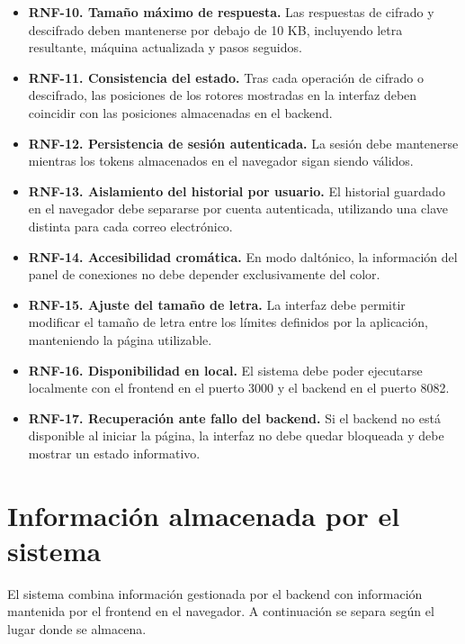 \begin{itemize}
    \item \textbf{RNF-10. Tamaño máximo de respuesta.} Las respuestas de cifrado y descifrado deben mantenerse por debajo de 10 KB, incluyendo letra resultante, máquina actualizada y pasos seguidos.

    \item \textbf{RNF-11. Consistencia del estado.} Tras cada operación de cifrado o descifrado, las posiciones de los rotores mostradas en la interfaz deben coincidir con las posiciones almacenadas en el backend.

    \item \textbf{RNF-12. Persistencia de sesión autenticada.} La sesión debe mantenerse mientras los tokens almacenados en el navegador sigan siendo válidos.

    \item \textbf{RNF-13. Aislamiento del historial por usuario.} El historial guardado en el navegador debe separarse por cuenta autenticada, utilizando una clave distinta para cada correo electrónico.

    \item \textbf{RNF-14. Accesibilidad cromática.} En modo daltónico, la información del panel de conexiones no debe depender exclusivamente del color.

    \item \textbf{RNF-15. Ajuste del tamaño de letra.} La interfaz debe permitir modificar el tamaño de letra entre los límites definidos por la aplicación, manteniendo la página utilizable.

    \item \textbf{RNF-16. Disponibilidad en local.} El sistema debe poder ejecutarse localmente con el frontend en el puerto 3000 y el backend en el puerto 8082.

    \item \textbf{RNF-17. Recuperación ante fallo del backend.} Si el backend no está disponible al iniciar la página, la interfaz no debe quedar bloqueada y debe mostrar un estado informativo.
\end{itemize}

\section{Información almacenada por el sistema}

El sistema combina información gestionada por el backend con información mantenida por el frontend en el navegador. A continuación se separa según el lugar donde se almacena.

